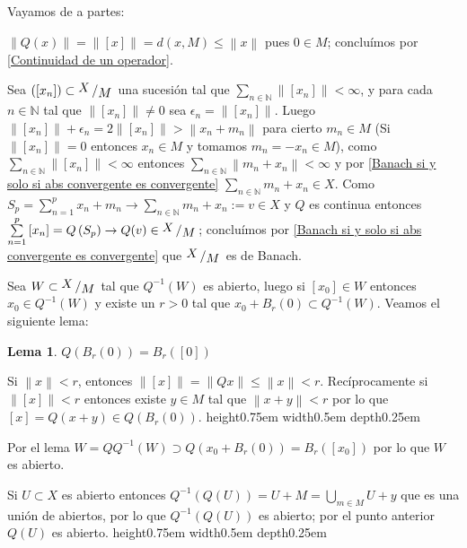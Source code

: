 \documentclass[11pt]{article}
\newcommand{\N}{{\mathbb{N}}}
\newcommand{\norm}[1]{\left\lVert#1\right\rVert}
\newcommand{\Bigcup}[2]{\bigcup\limits_{#1}{#2}}
\newcommand{\Bigsum}[2]{\sum\limits_{#1}{#2}}
\newcommand{\quotient}[2]{{\raisebox{.2em}{$#1$}\left/\raisebox{-.2em}{$#2$}\right.}}
\numberwithin{theorem}{subsection}
\newtheorem{lemma}[theorem]{Lema}
\newenvironment{proof}[1][Demostraci\'on]{\begin{trivlist}
		\item[\hskip \labelsep {\bfseries #1}]}{\end{trivlist}}
\newcommand{\qed}{\nobreak \ifvmode \relax \else
	\ifdim\lastskip<1.5em \hskip-\lastskip
	\hskip1.5em plus0em minus0.5em \fi \nobreak
	\vrule height0.75em width0.5em depth0.25em\fi}
\begin{document}
\begin{proof}
	Vayamos de a partes:
	
	\begin{enumerate}
		\item $\norm{Q(x)} = \norm{[x]} = d(x,M) \leq \norm{x}$ pues $0 \in M$; conclu\'imos por \ref{Continuidad de un operador}.
		
		\item Sea $\left([x_n]\right) \subset \quotient{X}{M}$ una sucesi\'on tal que $\Bigsum{n \in \N}{\norm{[x_n]}} < \infty$, y para cada $n \in \N$ tal que $\norm{[x_n]} \neq 0$ sea $\epsilon_n = \norm{[x_n]}$. Luego $\norm{[x_n]} + \epsilon_n = 2\norm{[x_n]} >  \norm{x_n + m_n}$ para cierto $m_n \in M$  (Si $\norm{[x_n]} = 0$ entonces $x_n \in M$ y tomamos $m_n = -x_n \in M$), como $\Bigsum{n \in \N}{\norm{[x_n]}} < \infty$ entonces $\Bigsum{n \in \N}{\norm{m_n + x_n}} < \infty$ y por \ref{Banach si y solo si abs convergente es convergente} $\Bigsum{n \in \N}{m_n + x_n} \in X$. Como $S_p = \sum\limits_{n = 1}^{p}{x_n + m_n} \rightarrow \Bigsum{n \in \N}{m_n + x_n}:= v \in X$ y $Q$ es continua entonces $\sum\limits_{n = 1}^{p}{[x_n]} = Q\left(S_p\right) \rightarrow Q(v) \in \quotient{X}{M}$; conclu\'imos por \ref{Banach si y solo si abs convergente es convergente} que $\quotient{X}{M}$ es de Banach.
		
		\item Sea $W \subset \quotient{X}{M}$ tal que $Q^{-1}(W)$ es abierto, luego si $[x_0] \in W$ entonces $x_0 \in Q^{-1}(W)$ y existe un $r > 0$ tal que $x_0 + B_r(0) \subset Q^{-1}(W)$. Veamos el siguiente lema:
		
		\begin{lemma}
			$Q(B_r(0)) = B_r([0])$
		\end{lemma}
		
		\begin{proof}[Demostraci\'on del lema]
			Si $\norm{x} < r$, entonces $\norm{[x]} = \norm{Qx} \leq \norm{x} < r$. Rec\'iprocamente si $\norm{[x]} < r$ entonces existe $y \in M$ tal que $\norm{x+y} < r$ por lo que $[x] = Q(x+y) \in Q(B_r(0))$. \qed
		\end{proof}
		
		Por el lema $W = QQ^{-1}(W) \supset Q(x_0 + B_r(0)) = B_r([x_0])$ por lo que $W$ es abierto.
		
		\item Si $U \subset X$ es abierto entonces $Q^{-1}(Q(U)) = U + M = \Bigcup{m \in M}{U+y}$ que es una uni\'on de abiertos, por lo que $Q^{-1}(Q(U))$ es abierto; por el punto anterior $Q(U)$ es abierto. \qed
		
	\end{enumerate}
\end{proof}
\end{document}
